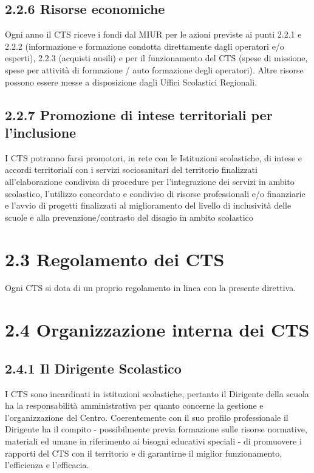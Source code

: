 \subsection*{2.2.6 Risorse economiche} Ogni anno il CTS riceve i fondi dal MIUR per le azioni previste ai punti 2.2.1 e 2.2.2 (informazione e
formazione condotta direttamente dagli operatori e/o esperti), 2.2.3 (acquisti ausili) e per il funzionamento
del CTS (spese di missione, spese per attività di formazione / auto formazione degli operatori). Altre risorse
possono essere messe a disposizione dagli Uffici Scolastici Regionali.
\subsection*{2.2.7 Promozione di intese territoriali per l'inclusione}
I CTS potranno farsi promotori, in rete con le Istituzioni scolastiche, di intese e accordi territoriali con i
servizi sociosanitari del territorio finalizzati all'elaborazione condivisa di procedure per l'integrazione dei
servizi in ambito scolastico, l'utilizzo concordato e condiviso di risorse professionali e/o finanziarie e l'avvio
di progetti finalizzati al miglioramento del livello di inclusività delle scuole e alla prevenzione/contrasto del
disagio in ambito scolastico
\section*{2.3 Regolamento dei CTS}
Ogni CTS si dota di un proprio regolamento in linea con la presente direttiva.
\section*{2.4 Organizzazione interna dei CTS}
\subsection*{2.4.1 Il Dirigente Scolastico}
I CTS sono incardinati in istituzioni scolastiche, pertanto il Dirigente della scuola ha la responsabilità
amministrativa per quanto concerne la gestione e l'organizzazione del Centro. Coerentemente con il suo
profilo professionale il Dirigente ha il compito - possibilmente previa formazione sulle risorse normative,
materiali ed umane in riferimento ai bisogni educativi speciali - di promuovere i rapporti del CTS con il
territorio e di garantirne il miglior funzionamento, l'efficienza e l'efficacia.
